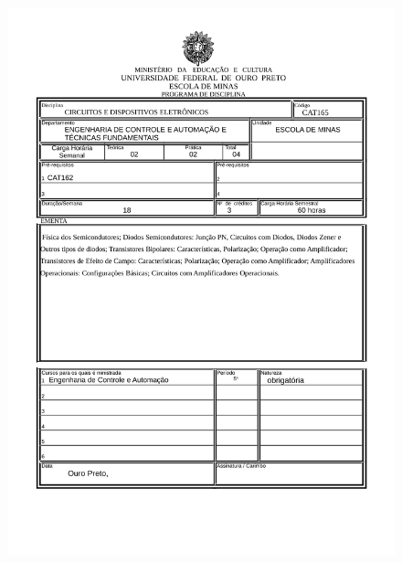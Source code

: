 \begin{figure}[p]
	\centering 
	\includegraphics[scale=0.7]{capitulos/anexo1-programas-disciplina/p55.pdf}
\end{figure}

